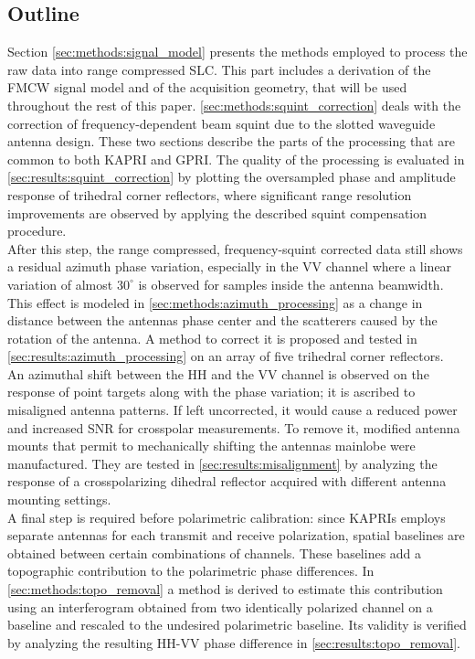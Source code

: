 \subsection{Outline}
Section \ref{sec:methods:signal_model} presents  the methods employed to process the raw data into range compressed SLC. This part includes a derivation of the FMCW signal model and of the acquisition geometry, that will be used throughout the rest of this paper. \autoref{sec:methods:squint_correction} deals with the correction of frequency-dependent beam squint due to the slotted waveguide antenna design. These two sections describe the parts of the processing that are common to both KAPRI and GPRI. The quality of the processing is evaluated in \autoref{sec:results:squint_correction} by plotting the oversampled phase and amplitude response of trihedral corner reflectors, where significant range resolution improvements are observed by applying the described squint compensation procedure.\\
After this step, the range compressed, frequency-squint corrected data still shows a residual azimuth phase variation, especially in the VV channel where a linear variation of almost $30^\circ$ is observed for samples inside the antenna beamwidth. This effect is modeled in \autoref{sec:methods:azimuth_processing} as a change in distance between the antennas phase center and the scatterers caused by the rotation of the antenna. A method to correct it is proposed and tested in \autoref{sec:results:azimuth_processing} on an array of five trihedral corner reflectors.\\ An azimuthal shift between the HH and the VV channel is observed on the  response of point targets along with the phase variation; it is ascribed to misaligned antenna patterns. If left uncorrected, it would cause a reduced power and increased SNR for crosspolar measurements. To remove it, modified antenna mounts that permit to mechanically shifting the antennas mainlobe were manufactured. They are tested in \autoref{sec:results:misalignment} by analyzing the response of a crosspolarizing dihedral reflector acquired with different antenna mounting settings.\\
A final step is required before polarimetric calibration: since KAPRIs employs separate antennas for each transmit and receive polarization, spatial baselines are obtained between certain combinations of channels. These baselines add a topographic contribution to the polarimetric phase differences. In \autoref{sec:methods:topo_removal} a method is derived to estimate this contribution using an interferogram obtained from two identically polarized channel on a baseline and rescaled to the undesired polarimetric baseline. Its validity is verified by analyzing the resulting HH-VV phase difference in \autoref{sec:results:topo_removal}.\\
